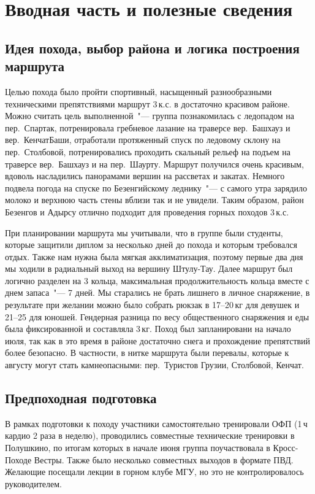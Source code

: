 \section{Вводная часть и полезные сведения}\label{sec:introduction}
	\subsection{Идея похода, выбор района и логика построения маршрута}
		Целью похода было пройти спортивный, насыщенный разнообразными техническими препятствиями маршрут 3\,к.с.
		в достаточно красивом районе. Можно считать цель выполненной~"--- группа познакомилась с ледопадом на
		пер.~Спартак, потренировала гребневое лазание на траверсе вер.~Башхауз и вер.~КенчатБаши, отработали протяженный
		спуск по ледовому склону на пер.~Столбовой, потренировались проходить скальный рельеф на подъем на траверсе
		вер.~Башхауз и на пер.~Шаурту. Маршрут получился очень красивым, вдоволь насладились панорамами вершин на
		рассветах и закатах. Немного подвела погода на спуске по Безенгийскому леднику~"--- с самого утра зарядило молоко
		и верхнюю часть стены вблизи так и не увидели. Таким образом, район Безенгов и Адырсу отлично подходит для
		проведения горных походов 3\,к.с. 
		
		При планировании маршрута мы учитывали, что в группе были студенты, которые защитили диплом за несколько дней
		до похода и которым требовался отдых. Также нам нужна была мягкая акклиматизация, поэтому первые два дня мы
		ходили в радиальный выход на вершину Штулу-Тау. Далее маршрут был логично разделен на 3 кольца, максимальная
		продолжительность кольца вместе с днем запаса~"--- 7 дней. Мы старались не брать лишнего в личное снаряжение,
		в результате при желании можно было собрать рюкзак в 17--20\,кг для девушек и 21--25 для юношей. Гендерная разница
		по весу общественного снаряжения и еды была фиксированной и составляла 3\,кг. Поход был запланировани на начало
		июля, так как в это время в районе достаточно снега и прохождение препятствий более безопасно. В частности, в
		нитке маршрута были перевалы, которые к августу могут стать камнеопасными: пер.~Туристов Грузии, Столбовой, Кенчат.
	
	
	\subsection{Предпоходная подготовка}
		В рамках подготовки к походу участники самостоятельно тренировали ОФП (1\,ч кардио 2 раза в неделю), проводились
		совместные технические тренировки в Полушкино, по итогам которых в начале июня группа поучаствовала в Кросс-Походе
		Вестры. Также было несколько совместных выходов в формате ПВД. Желающие посещали лекции в горном клубе МГУ, но это
		не контролировалось руководителем.
	

